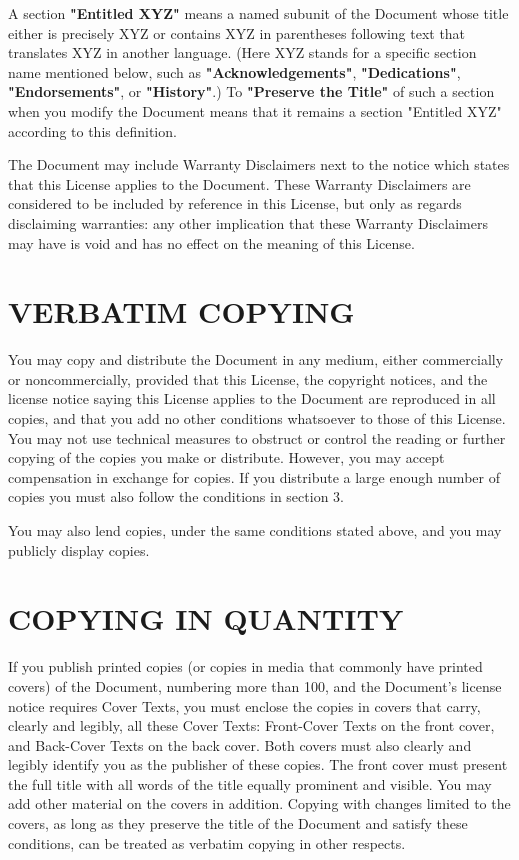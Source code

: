 \documentclass{stacks-project-book}
\theoremstyle{plain}
\theoremstyle{definition}
\theoremstyle{remark}
\numberwithin{equation}{subsection}
\begin{document}
A section \textbf{"Entitled XYZ"} means a named subunit of the Document whose
title either is precisely XYZ or contains XYZ in parentheses following
text that translates XYZ in another language.  (Here XYZ stands for a
specific section name mentioned below, such as \textbf{"Acknowledgements"},
\textbf{"Dedications"}, \textbf{"Endorsements"}, or \textbf{"History"}.)
To \textbf{"Preserve the Title"}
of such a section when you modify the Document means that it remains a
section "Entitled XYZ" according to this definition.

The Document may include Warranty Disclaimers next to the notice which
states that this License applies to the Document.  These Warranty
Disclaimers are considered to be included by reference in this
License, but only as regards disclaiming warranties: any other
implication that these Warranty Disclaimers may have is void and has
no effect on the meaning of this License.


\section{VERBATIM COPYING}
\label{fdl-section-verbatim-copying}

You may copy and distribute the Document in any medium, either
commercially or noncommercially, provided that this License, the
copyright notices, and the license notice saying this License applies
to the Document are reproduced in all copies, and that you add no other
conditions whatsoever to those of this License.  You may not use
technical measures to obstruct or control the reading or further
copying of the copies you make or distribute.  However, you may accept
compensation in exchange for copies.  If you distribute a large enough
number of copies you must also follow the conditions in section 3.

You may also lend copies, under the same conditions stated above, and
you may publicly display copies.


\section{COPYING IN QUANTITY}
\label{fdl-section-copying-in-quantity}


If you publish printed copies (or copies in media that commonly have
printed covers) of the Document, numbering more than 100, and the
Document's license notice requires Cover Texts, you must enclose the
copies in covers that carry, clearly and legibly, all these Cover
Texts: Front-Cover Texts on the front cover, and Back-Cover Texts on
the back cover.  Both covers must also clearly and legibly identify
you as the publisher of these copies.  The front cover must present
the full title with all words of the title equally prominent and
visible.  You may add other material on the covers in addition.
Copying with changes limited to the covers, as long as they preserve
the title of the Document and satisfy these conditions, can be treated
as verbatim copying in other respects.
\end{document}
